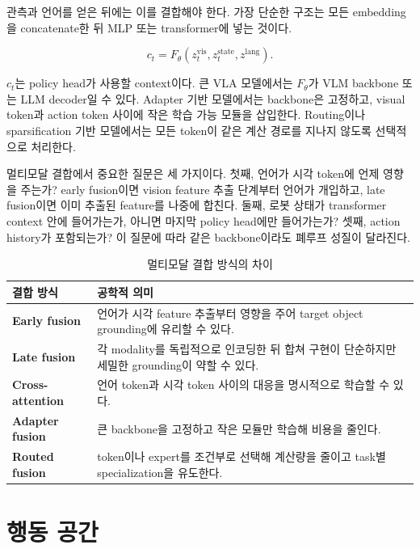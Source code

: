 관측과 언어를 얻은 뒤에는 이를 결합해야 한다. 가장 단순한 구조는 모든 embedding을 concatenate한 뒤 MLP 또는 transformer에 넣는 것이다.

\begin{equation}
  c_t =
  F_\theta
  \left(
    z_t^{\mathrm{vis}},
    z_t^{\mathrm{state}},
    z^{\mathrm{lang}}
  \right).
  \label{eq:context}
\end{equation}

$c_t$는 policy head가 사용할 context이다. 큰 VLA 모델에서는 $F_\theta$가 VLM backbone 또는 LLM decoder일 수 있다. Adapter 기반 모델에서는 backbone은 고정하고, visual token과 action token 사이에 작은 학습 가능 모듈을 삽입한다. Routing이나 sparsification 기반 모델에서는 모든 token이 같은 계산 경로를 지나지 않도록 선택적으로 처리한다.

멀티모달 결합에서 중요한 질문은 세 가지이다. 첫째, 언어가 시각 token에 언제 영향을 주는가? early fusion이면 vision feature 추출 단계부터 언어가 개입하고, late fusion이면 이미 추출된 feature를 나중에 합친다. 둘째, 로봇 상태가 transformer context 안에 들어가는가, 아니면 마지막 policy head에만 들어가는가? 셋째, action history가 포함되는가? 이 질문에 따라 같은 backbone이라도 폐루프 성질이 달라진다.

\begin{table}[t]
  \centering
  \caption{멀티모달 결합 방식의 차이}
  \label{tab:fusion_types}
  \begin{tabularx}{\textwidth}{>{\bfseries}p{32mm}X}
    \toprule
    결합 방식 & 공학적 의미 \\
    \midrule
    Early fusion & 언어가 시각 feature 추출부터 영향을 주어 target object grounding에 유리할 수 있다. \\
    Late fusion & 각 modality를 독립적으로 인코딩한 뒤 합쳐 구현이 단순하지만 세밀한 grounding이 약할 수 있다. \\
    Cross-attention & 언어 token과 시각 token 사이의 대응을 명시적으로 학습할 수 있다. \\
    Adapter fusion & 큰 backbone을 고정하고 작은 모듈만 학습해 비용을 줄인다. \\
    Routed fusion & token이나 expert를 조건부로 선택해 계산량을 줄이고 task별 specialization을 유도한다. \\
    \bottomrule
  \end{tabularx}
\end{table}

\section{행동 공간}

